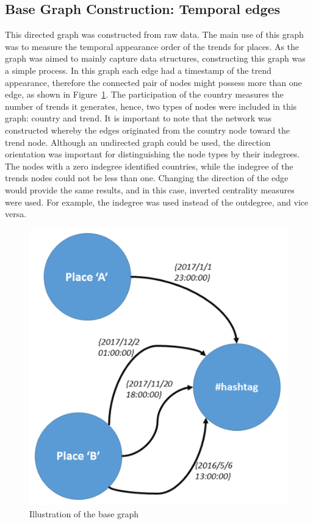 \documentclass{comjnl}
\begin{document}
\subsection{Base Graph Construction: Temporal edges}

This directed graph was constructed from raw data. The main use of this graph was to measure the temporal appearance order of the trends for places. As the graph was aimed to mainly capture data structures, constructing this graph was a simple process.  In this graph each edge had a timestamp of the trend appearance, therefore the connected pair of nodes might possess more than one edge, as shown in Figure~\ref{fig:basegraph}. The participation of the country measures the number of trends it generates, hence, two types of nodes were included in this graph: country and trend. It is important to note that the network was constructed whereby the edges originated from the country node toward the trend node. Although an undirected graph could be used, the direction orientation was important for distinguishing the node types by their indegrees. The nodes with a zero indegree identified countries, while the indegree of the trends nodes could not be less than one. Changing the direction of the edge would provide the same results, and in this case, inverted centrality measures were used. For example, the indegree was used instead of the outdegree, and vice versa.

\begin{figure}[htb] \centering
\includegraphics[width=\columnwidth]{images/base_graph.png}
\caption{Illustration of the base graph}
\label{fig:basegraph}
\end{figure}
\end{document}
